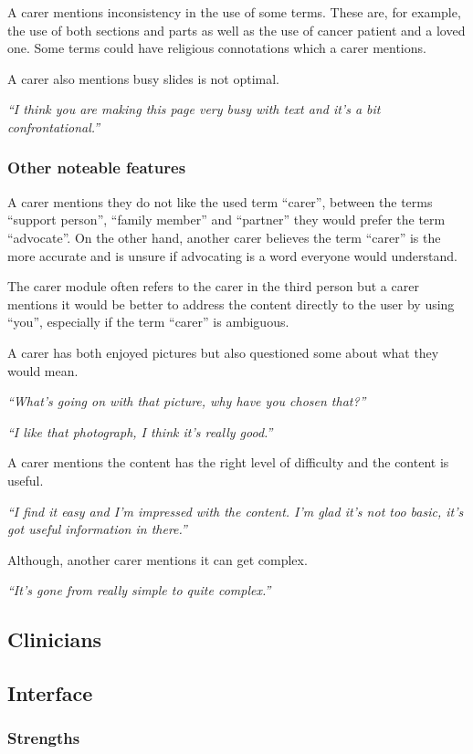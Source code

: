 \documentclass{sigchi}
\begin{document}
A carer mentions inconsistency in the use of some terms. These are, for example, the use of both sections and parts as well as the use of cancer patient and a loved one. Some terms could have religious connotations which a carer mentions.

A carer also mentions busy slides is not optimal.

\textit{“I think you are making this page very busy with text and it’s a bit confrontational.”}

\subsubsection{Other noteable features}
A carer mentions they do not like the used term “carer”, between the terms “support person”, “family member” and “partner” they would prefer the term “advocate”. On the other hand, another carer believes the term “carer” is the more accurate and is unsure if advocating is a word everyone would understand.

The carer module often refers to the carer in the third person but a carer mentions it would be better to address the content directly to the user by using “you”, especially if the term “carer” is ambiguous. 

A carer has both enjoyed pictures but also questioned some about what they would mean.

\textit{“What’s going on with that picture, why have you chosen that?”}

\textit{“I like that photograph, I think it’s really good.”}

A carer mentions the content has the right level of difficulty and the content is useful. 

\textit{“I find it easy and I’m impressed with the content. I’m glad it’s not too basic, it’s got useful information in there.”}

Although, another carer mentions it can get complex.

\textit{“It’s gone from really simple to quite complex.”}

\subsection{Clinicians}

\subsection{Interface}
\subsubsection{Strengths}
\end{document}
